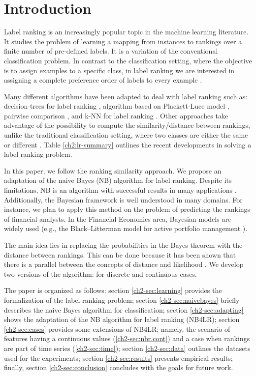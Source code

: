 





\section{Introduction}
Label ranking is an increasingly popular topic in the machine learning literature. It studies the problem of learning a mapping from instances to rankings over a finite number of pre-defined labels. It is a variation of the conventional classification problem. In contrast to the classification setting, where the objective is to assign examples to a specific class, in label ranking we are interested in assigning a complete preference order of labels to every example \citep{cheng2009}.

Many different algorithms have been adapted to deal with label ranking such as: decision-trees for label ranking \citep{cheng2009}, algorithm based on Plackett-Luce model \citep{cheng2010}, pairwise comparison \citep{hullermeier}, and k-NN for label ranking \citep{brazdil2003}. Other approaches take advantage of the possibility to compute the similarity/distance between rankings, unlike the traditional classification setting, where two classes are either the same or different \citep{todorovski2002}. Table \ref{ch2:lr-summary} outlines the recent developments in solving a label ranking problem.

In this paper, we follow the ranking similarity approach. We propose an adaptation of the naive Bayes (NB) algorithm for label ranking. Despite its limitations, NB is an algorithm with successful results in many applications \citep{domingos1997}. Additionally, the Bayesian framework is well understood in many domains. For instance, we plan to apply this method on the problem of predicting the rankings of financial analysts. In the Financial Economics area, Bayesian models are widely used (e.g., the Black--Litterman model for active portfolio management \citep{black1992}).

The main idea lies in replacing the probabilities in the Bayes theorem with the distance between rankings. This can be done because it has been shown that there is a parallel between the concepts of distance and likelihood \citep{vogt2007}. We develop two versions of the algorithm: for discrete and continuous cases.

The paper is organized as follows: section \ref{ch2-sec:learning} provides the formalization of the label ranking problem;
section \ref{ch2-sec:naivebayes} briefly  describes the naive Bayes algorithm for classification; section \ref{ch2-sec:adapting} shows the adaptation of the NB algorithm for label ranking (NB4LR);
section \ref{ch2-sec:cases} provides some extensions of NB4LR; namely, the scenario of features having a continuous values (\ref{ch2-sec:nbr.cont})  and a case when rankings are part of time series (\ref{ch2-sec:time}); section \ref{ch2-sec:data} outlines the datasets used for the experiments;
section \ref{ch2-sec:results} presents empirical results; finally, section \ref{ch2-sec:conclusion} concludes with the goals for future work.

